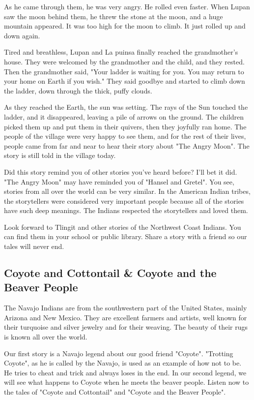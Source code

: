 As he came through them, he was very angry. He rolled even faster. When Lupan saw the moon behind them, he threw the stone at the moon, and a huge mountain appeared. It was too high for the moon to climb. It just rolled up and down again.

Tired and breathless, Lupan and La puinsa finally reached the grandmother's house. They were welcomed by the grandmother and the child, and they rested. Then the grandmother said, "Your ladder is waiting for you. You may return to your home on Earth if you wish." They said goodbye and started to climb down the ladder, down through the thick, puffy clouds.

As they reached the Earth, the sun was setting. The rays of the Sun touched the ladder, and it disappeared, leaving a pile of arrows on the ground. The children picked them up and put them in their quivers, then they joyfully ran home. The people of the village were very happy to see them, and for the rest of their lives, people came from far and near to hear their story about "The Angry Moon". The story is still told in the village today.

Did this story remind you of other stories you've heard before? I'll bet it did. "The Angry Moon" may have reminded you of "Hansel and Gretel". You see, stories from all over the world can be very similar. In the American Indian tribes, the storytellers were considered very important people because all of the stories have such deep meanings. The Indians respected the storytellers and loved them.

Look forward to Tlingit and other stories of the Northwest Coast Indians. You can find them in your school or public library. Share a story with a friend so our tales will never end.

\subsection{Coyote and Cottontail \& Coyote and the Beaver People}

The Navajo Indians are from the southwestern part of the United States, mainly Arizona and New Mexico. They are excellent farmers and artists, well known for their turquoise and silver jewelry and for their weaving. The beauty of their rugs is known all over the world.

Our first story is a Navajo legend about our good friend "Coyote". "Trotting Coyote", as he is called by the Navajo, is used as an example of how not to be. He tries to cheat and trick and always loses in the end. In our second legend, we will see what happens to Coyote when he meets the beaver people. Listen now to the tales of "Coyote and Cottontail" and "Coyote and the Beaver People".

